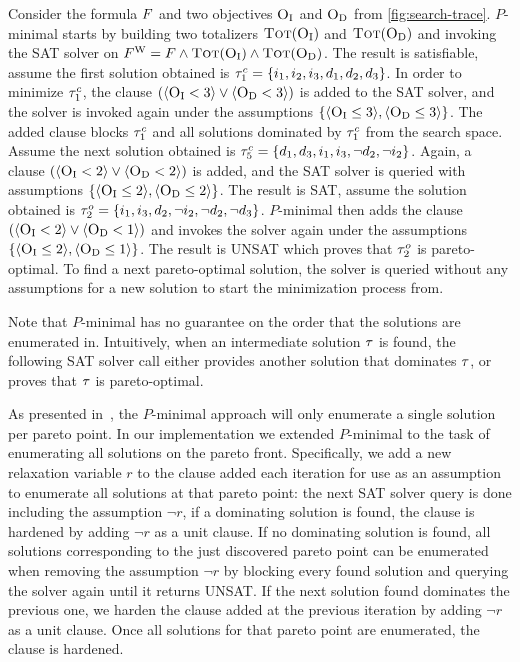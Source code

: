 \begin{example}\label{ex:pmin}
  Consider the formula $F$ and two objectives $\textsc{O}_{\text{I}}$ and $\textsc{O}_{\text{D}}$ from \cref{fig:search-trace}.
  $P$-minimal starts by building two totalizers $\textsc{Tot}(\textsc{O}_{\text{I}})$ and $\textsc{Tot}(\textsc{O}_{\text{D}})$ and invoking the SAT solver on $F^\text{W} = F \land \textsc{Tot}(\textsc{O}_{\text{I}}) \land \textsc{Tot}(\textsc{O}_{\text{D}})$.
  The result is satisfiable, assume the first solution obtained is $\tau^c_1 = \{i_1, i_2, i_3, d_1, d_2, d_3\}$. 
  In order to minimize $\tau^c_1$, the clause $(\langle \textsc{O}_{\text{I}} < 3 \rangle \lor \langle \textsc{O}_{\text{D}} < 3 \rangle)$ is added to the SAT solver, and the solver is invoked again under the assumptions $\{ \langle \textsc{O}_{\text{I}} \leq 3 \rangle, \langle \textsc{O}_{\text{D}} \leq 3 \rangle \}$.
  The added clause blocks $\tau^c_1$ and all solutions dominated by $\tau^c_1$ from the search space.
  Assume the next solution obtained is $\tau^c_5 = \{d_1, d_3, i_1, i_3, \lnot d_2, \lnot i_2\}$. 
  Again, a clause $(\langle \textsc{O}_{\text{I}} < 2 \rangle \lor \langle \textsc{O}_{\text{D}} < 2 \rangle)$ is added, and the SAT solver is queried with assumptions $\{ \langle \textsc{O}_{\text{I}} \leq 2 \rangle, \langle \textsc{O}_{\text{D}} \leq 2 \rangle \}$.
  The result is SAT, assume the solution obtained is $\tau^o_2 = \{ i_1, i_3, d_2, \lnot i_2, \lnot d_2, \lnot d_3\}$. 
  $P$-minimal then adds the clause $(\langle \textsc{O}_{\text{I}} < 2 \rangle \lor \langle \textsc{O}_{\text{D}} < 1 \rangle)$ and invokes the solver again under the assumptions $\{ \langle \textsc{O}_{\text{I}} \leq 2 \rangle, \langle \textsc{O}_{\text{D}} \leq 1 \rangle \}$.
  The result is UNSAT which proves that $\tau^o_2$ is pareto-optimal. 
  To find a next pareto-optimal solution, the solver is queried without any assumptions for a new solution to start the minimization process from.
\end{example}

Note that $P$-minimal has no guarantee on the order that the solutions are enumerated in. 
Intuitively, when an intermediate solution $\tau$ is found, the following SAT solver call either provides another solution that dominates $\tau$, or proves that $\tau$ is pareto-optimal.  

As presented in~\cite{DBLP:conf/cp/SohBTB17}, the $P$-minimal approach will only enumerate a single solution per pareto point.
In our implementation we extended $P$-minimal to the task of enumerating all solutions on the pareto front.
Specifically, we add a new relaxation variable $r$ to the clause added each iteration for use as an assumption to enumerate all solutions at that pareto point:
the next SAT solver query is done including the assumption $\lnot r$, if a dominating solution is found, the clause is hardened by adding $\lnot r$ as a unit clause.
If no dominating solution is found, all solutions corresponding to the just discovered pareto point can be enumerated when removing the assumption $\lnot r$ by blocking every found solution and querying the solver again until it returns UNSAT.
If the next solution found dominates the previous one, we harden the clause added at the previous iteration by adding $\lnot r$ as a unit clause.
Once all solutions for that pareto point are enumerated, the clause is hardened.

